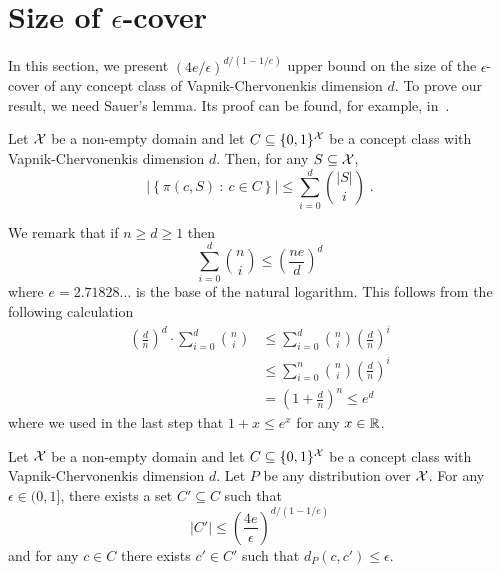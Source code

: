 \section{Size of $\epsilon$-cover}
\label{section:epsilon-cover}

In this section, we present $(4e/\epsilon)^{d/(1 - 1/e)}$ upper bound on the
size of the $\epsilon$-cover of any concept class of Vapnik-Chervonenkis
dimension $d$. To prove our result, we need Sauer's lemma. Its proof can be
found, for example, in~\citet[Chapter 3]{Anthony-Bartlett-1999}.

\begin{lemma}
Let $\mathcal{X}$ be a non-empty domain and let $C \subseteq \{0,1\}^{\mathcal{X}}$ be a concept class
with Vapnik-Chervonenkis dimension $d$. Then, for any $S \subseteq \mathcal{X}$,
$$
\left| \left\{ \pi(c, S) ~:~ c \in C \right\} \right| \le \sum_{i=0}^d \binom{|S|}{i} \; .
$$
\end{lemma}

We remark that if $n \ge d \ge 1$ then
\begin{equation}
\label{equation:sauer-lemma-estimate}
\sum_{i=0}^d \binom{n}{i} \le \left( \frac{ne}{d} \right)^d
\end{equation}
where $e = 2.71828 \dots$ is the base of the natural logarithm. This follows
from the following calculation
\begin{align*}
\left( \frac{d}{n} \right)^d \cdot \sum_{i=0}^d \binom{n}{i}
& \le \sum_{i=0}^d \binom{n}{i} \left( \frac{d}{n} \right)^i \\
& \le \sum_{i=0}^n \binom{n}{i} \left( \frac{d}{n} \right)^i \\
& = \left(1 + \frac{d}{n} \right)^n \le e^d
\end{align*}
where we used in the last step that $1 + x \le e^x$ for any $x \in \mathbb{R}$.

\begin{theorem}
Let $\mathcal{X}$ be a non-empty domain and let $C \subseteq \{0,1\}^{\mathcal{X}}$ be a concept
class with Vapnik-Chervonenkis dimension $d$. Let $P$ be any distribution over
$\mathcal{X}$. For any $\epsilon \in (0,1]$, there exists a set $C' \subseteq C$ such that
\begin{equation}
\label{equation:theorem-epsilon-cover}
|C'| \le \left( \frac{4e}{\epsilon} \right)^{d/(1-1/e)}
\end{equation}
and for any $c \in C$ there exists $c' \in C'$ such that $d_P(c,c') \le \epsilon$.
\end{theorem}

